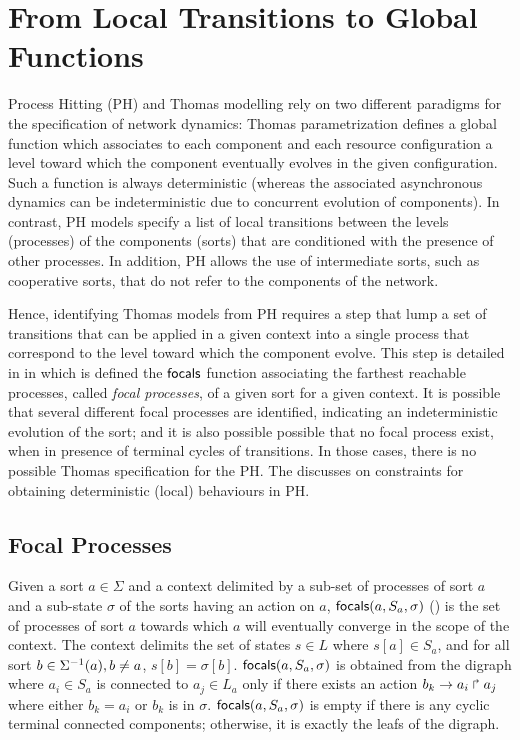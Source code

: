 \section{From Local Transitions to Global Functions}\label{sec:tr2global}

Process Hitting (PH) and Thomas modelling rely on two different paradigms for the specification of
network dynamics:
Thomas parametrization defines a global function
which associates to each component and each resource configuration a level toward which the component
eventually evolves in the given configuration.
Such a function is always deterministic (whereas the associated asynchronous dynamics can be
indeterministic due to concurrent evolution of components).
In contrast, 
PH models specify a list of local transitions between the levels (processes) of the components (sorts)
that are conditioned with the presence of other processes.
In addition, PH allows the use of intermediate sorts, such as cooperative sorts, that do not refer
to the components of the network.

Hence, identifying Thomas models from PH requires a step that lump a set of transitions that can be
applied in a given context into a single process that correspond to the level toward which the
component evolve.
This step is detailed in  in which is defined the $\mathsf{focals}$ function associating 
the farthest reachable processes, called \emph{focal processes}, of a given sort for a given context.
It is possible that several different focal processes are identified, indicating an indeterministic
evolution of the sort;
and it is also possible possible that no focal process exist, when in presence of terminal cycles of
transitions.
In those cases, there is no possible Thomas specification for the PH.
The  discusses on constraints for obtaining deterministic
(local) behaviours in PH.

\subsection{Focal Processes}\label{ssec:focal}

Given a sort $a\in\Sigma$ and a context delimited by 
a sub-set of processes of sort $a$ and a sub-state $\sigma$
of the sorts having an action on $a$,
$\mathsf{focals}(a,S_a,\sigma)$ () is the set of processes of sort $a$ towards which
$a$ will eventually converge in the scope of the context.
The context delimits the set of states $s\in L$ where $s[a]\in S_a$, and for all 
sort $b\in\Sigma^{-1}(a), b\neq a$,
$s[b]=\sigma[b]$.
$\mathsf{focals}(a,S_a,\sigma)$ is obtained from the digraph where $a_i\in S_a$ is connected to $a_j\in L_a$ only if there
exists an action $b_k\rightarrow a_i\Rsh a_j$ where either $b_k = a_i$ or $b_k$ is in $\sigma$.
$\mathsf{focals}(a,S_a,\sigma)$ is empty if there is any cyclic terminal connected components;
otherwise, it is exactly the leafs of the digraph.


